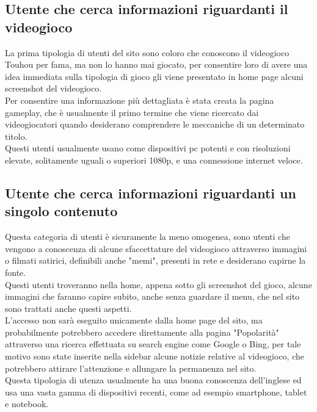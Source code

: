 \documentclass[openany, a4paper, 12pt]{report}
\begin{document}
	\subsection{Utente che cerca informazioni riguardanti il videogioco}
	La prima tipologia di utenti del sito sono coloro che conoscono il videogioco Touhou per fama, ma non lo hanno mai giocato, per consentire loro di avere una idea immediata sulla tipologia di gioco gli viene presentato in home page alcuni screenshot del videogioco.\\
	Per consentire una informazione più dettagliata è stata creata la pagina gameplay, che è usualmente il primo termine che viene ricercato dai videogiocatori quando desiderano comprendere le meccaniche di un determinato titolo.\\
	Questi utenti usualmente usano come dispositivi pc potenti e con risoluzioni elevate, solitamente uguali o superiori 1080p, e una connessione internet veloce.
	\subsection{Utente che cerca informazioni riguardanti un singolo contenuto}
	Questa categoria di utenti è sicuramente la meno omogenea, sono utenti che vengono a conoscenza di alcune sfaccettature del videogioco attraverso immagini o filmati satirici, definibili anche "memi", presenti in rete e desiderano capirne la fonte.\\
	Questi utenti troveranno nella home, appena sotto gli screenshot del gioco, alcune immagini che faranno capire subito, anche senza guardare il menu, che nel sito sono trattati anche questi aspetti.\\
	L'accesso non sarà eseguito unicamente dalla home page del sito, ma probabilmente potrebbero accedere direttamente alla pagina "Popolarità" attraverso una ricerca effettuata su search engine come Google o Bing, per tale motivo sono state inserite nella sidebar alcune notizie relative al videogioco, che potrebbero attirare l'attenzione e allungare la permanenza nel sito.\\
	Questa tipologia di utenza usualmente ha una buona conoscenza dell'inglese ed usa una vasta gamma di dispositivi recenti, come ad esempio smartphone, tablet e notebook.\\
\end{document}
